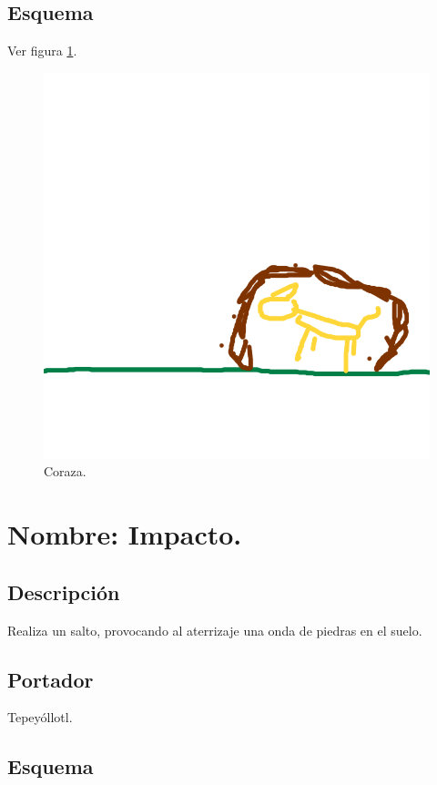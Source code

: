 \subsection{Esquema}
			Ver figura \ref{fig:coraza}.
			\begin{figure}
				\centering
				\includegraphics[height=0.2 \textheight]{Imagenes/coraza}
				\caption{Coraza.}
				\label{fig:coraza}
			\end{figure}
\section{Nombre: Impacto.} \label{hab.impacto}
\subsection{Descripción}
Realiza un salto, provocando al aterrizaje una onda de piedras en el suelo.
\subsection{Portador}
Tepeyóllotl.
\subsection{Esquema}


